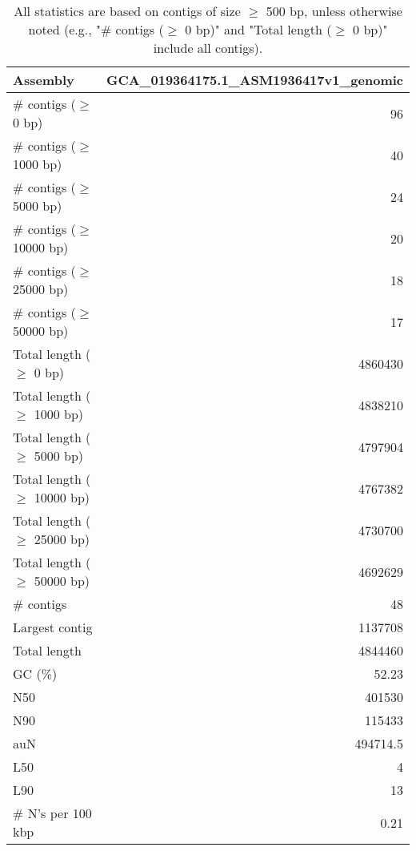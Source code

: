 \documentclass[12pt,a4paper]{article}
\begin{document}
\begin{table}[ht]
\begin{center}
\caption{All statistics are based on contigs of size $\geq$ 500 bp, unless otherwise noted (e.g., "\# contigs ($\geq$ 0 bp)" and "Total length ($\geq$ 0 bp)" include all contigs).}
\begin{tabular}{|l*{1}{|r}|}
\hline
Assembly & GCA\_019364175.1\_ASM1936417v1\_genomic \\ \hline
\# contigs ($\geq$ 0 bp) & 96 \\ \hline
\# contigs ($\geq$ 1000 bp) & 40 \\ \hline
\# contigs ($\geq$ 5000 bp) & 24 \\ \hline
\# contigs ($\geq$ 10000 bp) & 20 \\ \hline
\# contigs ($\geq$ 25000 bp) & 18 \\ \hline
\# contigs ($\geq$ 50000 bp) & 17 \\ \hline
Total length ($\geq$ 0 bp) & 4860430 \\ \hline
Total length ($\geq$ 1000 bp) & 4838210 \\ \hline
Total length ($\geq$ 5000 bp) & 4797904 \\ \hline
Total length ($\geq$ 10000 bp) & 4767382 \\ \hline
Total length ($\geq$ 25000 bp) & 4730700 \\ \hline
Total length ($\geq$ 50000 bp) & 4692629 \\ \hline
\# contigs & 48 \\ \hline
Largest contig & 1137708 \\ \hline
Total length & 4844460 \\ \hline
GC (\%) & 52.23 \\ \hline
N50 & 401530 \\ \hline
N90 & 115433 \\ \hline
auN & 494714.5 \\ \hline
L50 & 4 \\ \hline
L90 & 13 \\ \hline
\# N's per 100 kbp & 0.21 \\ \hline
\end{tabular}
\end{center}
\end{table}
\end{document}
